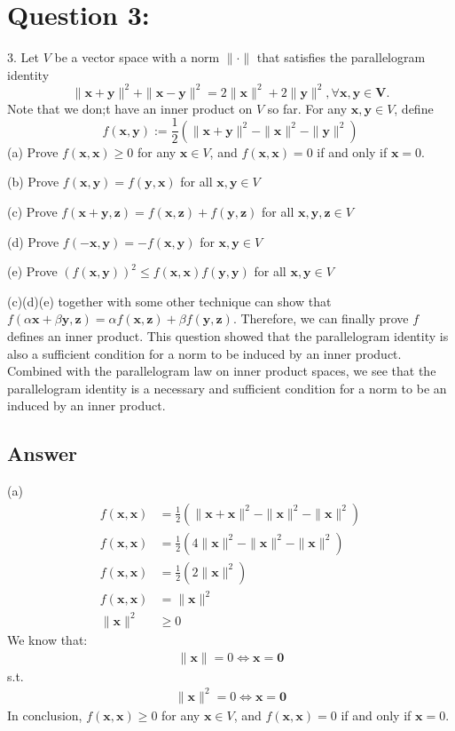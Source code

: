 \documentclass[a4paper,12pt]{article}
\begin{document}
\section*{Question 3:}
3. Let \(V\) be a vector space with a norm \(\|\cdot\|\) that satisfies the parallelogram identity
\[
    \|\bm{x} + \bm{y}\|^2 + \|\bm{x} - \bm{y}\|^2 = 2\|\bm{x}\|^2 + 2\|\bm{y}\|^2, \forall \bm{x}, \bm{y} \in \bm{V}.
\]
Note that we don;t have an inner product on \(V\) so far. For any \(\bm{x},\bm{y} \in V\), define
\[
    f(\bm{x}, \bm{y}) := \frac 1 2 (\|\bm{x} + \bm{y}\|^2 - \|\bm{x}\|^2 - \|\bm{y}\|^2)
\]
(a) Prove \(f(\bm{x}, \bm{x}) \geq 0\) for any \(\bm{x} \in V\), and \(f(\bm{x}, \bm{x}) = 0\) if and only if \(\bm{x} = 0\).

(b) Prove \(f(\bm{x}, \bm{y}) = f(\bm{y}, \bm{x})\) for all \(\bm{x}, \bm{y} \in V\)

(c) Prove \(f(\bm{x}+\bm{y}, \bm{z}) = f(\bm{x}, \bm{z}) + f(\bm{y}, \bm{z})\) for all \( \bm{x}, \bm{y}, \bm{z}\in V\)

(d) Prove \(f(-\bm{x}, \bm{y}) = -f(\bm{x}, \bm{y})\) for \(\bm{x}, \bm{y}\in V\)

(e) Prove \((f(\bm{x}, \bm{y}))^2 \leq f(\bm{x}, \bm{x})f(\bm{y}, \bm{y})\) for all \(\bm{x}, \bm{y} \in V\)

(c)(d)(e) together with some other technique can show that \(f(\alpha \bm{x} + \beta \bm{y}, \bm{z})  = \alpha f(\bm{x}, \bm{z}) + \beta f(\bm{y}, \bm{z})\).
Therefore, we can finally prove \(f\) defines an inner product. This question showed that the parallelogram
identity is also a sufficient condition for a norm to be induced by an inner product. Combined with
the parallelogram law on inner product spaces, we see that the parallelogram identity is a necessary
and sufficient condition for a norm to be an induced by an inner product.

\subsection*{Answer}
(a) 
\begin{align*}
    f(\bm{x}, \bm{x}) &= \frac 1 2 (\|\bm{x}+\bm{x}\|^2 - \|\bm{x}\|^2 - \|\bm{x}\|^2 ) \\
    f(\bm{x}, \bm{x}) &= \frac 1 2 (4\|\bm{x}\|^2 - \|\bm{x}\|^2 - \|\bm{x}\|^2 ) \\
    f(\bm{x}, \bm{x}) &= \frac 1 2 (2\|\bm{x}\|^2) \\
    f(\bm{x}, \bm{x}) &= \|\bm{x}\|^2 \\
    \|\bm{x}\|^2 &\geq 0 
\end{align*}
We know that:
\begin{align}
    \|\bm{x}\| = 0 \iff \bm{x} = \bm{0}
\end{align}
s.t.
\begin{align*}
    \|\bm{x}\|^2 = 0 \iff \bm{x} = \bm{0}
\end{align*}
In conclusion, \(f(\bm{x}, \bm{x}) \geq 0\) for any \(\bm{x} \in V\), and \(f(\bm{x}, \bm{x}) = 0\) if and only if \(\bm{x} = 0\).
\end{document}
